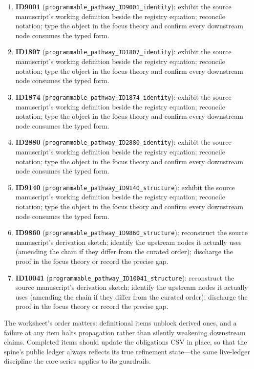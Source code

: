 \documentclass[11pt]{article}
\theoremstyle{remark}
\begin{document}
\begin{enumerate}
\item \textbf{ID9001} (\texttt{programmable\_pathway\_ID9001\_identity}): exhibit the source manuscript's working definition beside the registry equation; reconcile notation; type the object in the focus theory and confirm every downstream node consumes the typed form.
\item \textbf{ID1807} (\texttt{programmable\_pathway\_ID1807\_identity}): exhibit the source manuscript's working definition beside the registry equation; reconcile notation; type the object in the focus theory and confirm every downstream node consumes the typed form.
\item \textbf{ID1874} (\texttt{programmable\_pathway\_ID1874\_identity}): exhibit the source manuscript's working definition beside the registry equation; reconcile notation; type the object in the focus theory and confirm every downstream node consumes the typed form.
\item \textbf{ID2880} (\texttt{programmable\_pathway\_ID2880\_identity}): exhibit the source manuscript's working definition beside the registry equation; reconcile notation; type the object in the focus theory and confirm every downstream node consumes the typed form.
\item \textbf{ID9140} (\texttt{programmable\_pathway\_ID9140\_structure}): exhibit the source manuscript's working definition beside the registry equation; reconcile notation; type the object in the focus theory and confirm every downstream node consumes the typed form.
\item \textbf{ID9860} (\texttt{programmable\_pathway\_ID9860\_structure}): reconstruct the source manuscript's derivation sketch; identify the upstream nodes it actually uses (amending the chain if they differ from the curated order); discharge the proof in the focus theory or record the precise gap.
\item \textbf{ID10041} (\texttt{programmable\_pathway\_ID10041\_structure}): reconstruct the source manuscript's derivation sketch; identify the upstream nodes it actually uses (amending the chain if they differ from the curated order); discharge the proof in the focus theory or record the precise gap.
\end{enumerate}

The worksheet's order matters: definitional items unblock derived ones, and a failure at any item halts propagation rather than silently weakening downstream claims. Completed items should update the obligations CSV in place, so that the spine's public ledger always reflects its true refinement state---the same live-ledger discipline the core series applies to its guardrails.
\end{document}
